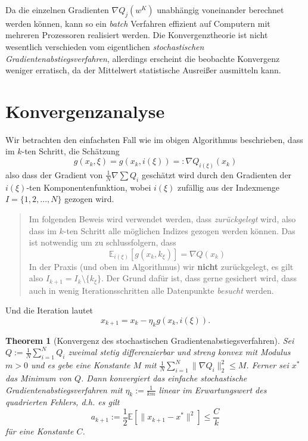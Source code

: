 \documentclass[
]{book}
\newenvironment {JHSAYS} [0] {\begin{quote}\color{jhsc}} {\end{quote}}
\newtheorem{theorem}{Theorem}[chapter]
\theoremstyle{definition}
\theoremstyle{definition}
\theoremstyle{definition}
\theoremstyle{definition}
\theoremstyle{remark}
\begin{document}
Da die einzelnen Gradienten \(\nabla Q_j(w^K)\) unabhängig voneinander berechnet werden können, kann so ein \emph{batch} Verfahren effizient auf Computern mit mehreren Prozessoren realisiert werden. Die Konvergenztheorie ist nicht wesentlich verschieden vom eigentlichen \emph{stochastischen Gradientenabstiegsverfahren}, allerdings erscheint die beobachte Konvergenz weniger erratisch, da der Mittelwert statistische Ausreißer ausmitteln kann.

\hypertarget{konvergenzanalyse}{%
\section{Konvergenzanalyse}\label{konvergenzanalyse}}

Wir betrachten den einfachsten Fall wie im obigen Algorithmus beschrieben, dass im \(k\)-ten Schritt, die Schätzung
\[g(x_k, \xi)=g(x_k, i(\xi))=:\nabla Q_{i(\xi)}(x_k)\]
also dass der Gradient von \(\frac 1N \nabla \sum Q_i\) geschätzt wird durch den Gradienten der \(i(\xi)\)-ten Komponentenfunktion, wobei \(i(\xi)\) zufällig aus der Indexmenge \(I=\{1, 2, \dotsc, N\}\) gezogen wird.

\leavevmode\hypertarget{sdg-put-it-back}{}%
\begin{JHSAYS}
Im folgenden Beweis wird verwendet werden, dass \emph{zurückgelegt} wird, also dass im \(k\)-ten Schritt alle möglichen Indizes gezogen werden können. Das ist notwendig um zu schlussfolgern, dass
\begin{equation*}
\mathbb E_{i(\xi)} [g(x_k, k_\xi)] = \nabla Q(x_k)
\end{equation*}
In der Praxis (und oben im Algorithmus) wir \textbf{nicht} zurückgelegt, es gilt also \(I_{k+1} = I_k \setminus \{k_\xi\}\). Der Grund dafür ist, dass gerne gesichert wird, dass auch in wenig Iterationsschritten alle Datenpunkte \emph{besucht} werden.

\end{JHSAYS}

Und die Iteration lautet
\begin{equation*}
x_{k+1} = x_k - \eta_k g(x_k, i(\xi)).
\end{equation*}

\begin{theorem}[Konvergenz des stochastischen Gradientenabstiegsverfahren]
\protect\hypertarget{thm:thm-convergence-stoch-grad}{}\label{thm:thm-convergence-stoch-grad}Sei \(Q:=\frac 1N \sum_{i=1}^NQ_i\) zweimal stetig differenzierbar und \emph{streng konvex} mit \emph{Modulus} \(m>0\) und es gebe eine Konstante \(M\) mit \(\frac 1N \sum_{i=1}^N \|\nabla Q_i \|_2^2 \leq M\). Ferner sei
\(x^*\) das Minimum von \(Q\). Dann konvergiert das einfache stochastische Gradientenabstiegsverfahren mit \(\eta_k := \frac{1}{km}\) linear im Erwartungswert des quadrierten Fehlers, d.h. es gilt
\begin{equation*}
a_{k+1} := \frac 12 \mathbb E [\| x_{k+1} - x^*\|^2 ] \leq \frac {C}{k}
\end{equation*}
für eine Konstante \(C\).
\end{theorem}
\end{document}
